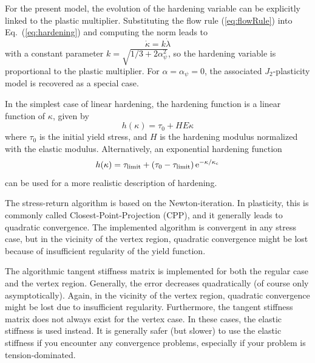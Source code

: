 \documentclass[epsf,a4paper]{article}
\newcommand{\be}{\begin{equation}}
\newcommand{\ee}{\end{equation}}
\newcommand {\alphaPsi}{\alpha_{\psi}}
\newcommand {\kappac}{\kappa_{\mathrm{c}}}
\begin{document}
For the present model, the evolution
of the hardening variable can be explicitly linked to the plastic
multiplier.  
Substituting the flow rule
(\ref{eq:flowRule}) into Eq.~(\ref{eq:hardening}) and computing the norm
leads to
\be
\label{eq:kFactor}
\dot\kappa = k \dot \lambda
\ee
with a constant parameter $k = \sqrt{1/3 + 2 \alphaPsi^2}$, so the
hardening variable is proportional to the plastic multiplier. 
For $\alpha=\alphaPsi=0$, the associated $J_2$-plasticity model
is recovered as a special case. 

In the simplest case of linear hardening, the hardening function is a
linear function of $\kappa$, given by
\be\label{bilin-soft}
h(\kappa)=\tau_0+H E\kappa
\ee
where $\tau_0$ is the initial yield stress, and $H$ is the 
hardening modulus normalized with the elastic modulus.
Alternatively, an exponential hardening function
\be
h(\kappa) = \tau_{\mathrm{limit}} + \left( \tau_0 - \tau_{\mathrm{limit}} \right) \rm e^{-\kappa/\kappac}
\ee
can be used for a more realistic description of hardening.

The stress-return algorithm is based on the Newton-iteration. 
In plasticity, this is commonly called Closest-Point-Projection (CPP),
and it generally leads to quadratic convergence. 
The implemented algorithm is convergent in any stress case, but
in the vicinity of the vertex region, quadratic convergence might be
lost because of insufficient regularity of the yield function.

The algorithmic tangent stiffness matrix is implemented for both the
regular case and the vertex region. 
Generally, the error decreases quadratically (of course only asymptotically).
Again, in the vicinity of the vertex region, quadratic convergence
might be lost due to insufficient regularity. 
Furthermore, the tangent stiffness matrix does not always exist for
the vertex case. In these cases, the elastic stiffness is used
instead.
It is generally safer (but slower) to use the elastic stiffness if you
encounter any convergence problems, especially if your problem is
tension-dominated.
\end{document}
